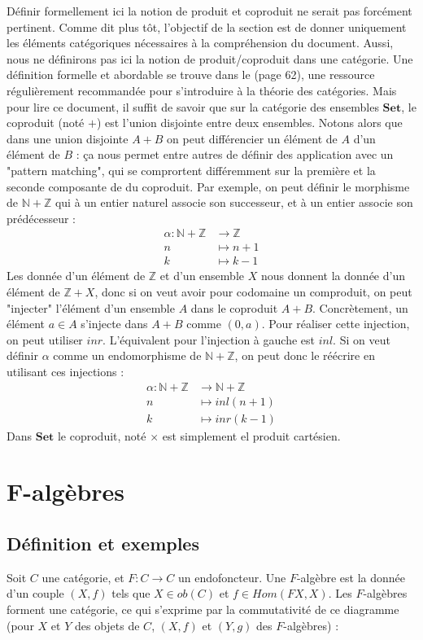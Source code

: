 \documentclass{article}
\newcommand{\N}{\mathbb{N}}
\newcommand{\Z}{\mathbb{Z}}
\begin{document}
Définir formellement ici la notion de produit et coproduit ne serait pas forcément pertinent. Comme dit plus tôt, l'objectif de la section est de donner uniquement les éléments catégoriques nécessaires à la compréhension du document. Aussi, nous ne définirons pas ici la notion de produit/coproduit dans une catégorie. Une définition formelle et abordable se trouve dans le \cite{MacLane} (page 62), une ressource régulièrement recommandée pour s'introduire à la théorie des catégories. Mais pour lire ce document, il suffit de savoir que sur la catégorie des ensembles $\mathbf{Set}$, le coproduit (noté $+$) est l'union disjointe entre deux ensembles. Notons alors que dans une union disjointe $A+B$ on peut différencier un élément de $A$ d'un élément de $B$ : ça nous permet entre autres de définir des application avec un "pattern matching", qui se comprortent différemment sur la première et la seconde composante de du coproduit. Par exemple, on peut définir le morphisme de $\N + \Z$ qui à un entier naturel associe son successeur, et à un entier associe son prédécesseur : 
\begin{align*}
     \alpha : \N + \Z & \rightarrow \Z \\ 
     n & \mapsto n+1 \\ 
     k & \mapsto k-1     
\end{align*}
Les donnée d'un élément de $\Z$ et d'un ensemble $X$ nous donnent la donnée d'un élément de $\Z + X$, donc si on veut avoir pour codomaine un comproduit, on peut "injecter" l'élément d'un ensemble $A$ dans le coproduit $A+B$. Concrètement,  un élément $a \in A$ s'injecte dans $A+B$ comme $(0,a)$. Pour réaliser cette injection, on peut utiliser $inr$. L'équivalent pour l'injection à gauche est $inl$. Si on veut définir $\alpha$ comme un endomorphisme de $\N + \Z$, on peut donc le réécrire en utilisant ces injections :
\begin{align*}
     \alpha : \N + \Z & \rightarrow \N + \Z \\ 
     n & \mapsto inl(n+1) \\ 
     k & \mapsto inr(k-1)     
\end{align*}
Dans $\mathbf{Set}$ le coproduit, noté $\times$ est simplement el produit cartésien. 


\section{F-algèbres}

\subsection{Définition et exemples}
Soit $C$ une catégorie, et $F :C \longrightarrow C$ un endofoncteur. Une $F$-algèbre est la donnée d'un couple $(X,f)$ tels que $X \in ob(C)$ et $f \in Hom(F X, X)$. Les $F$-algèbres forment une catégorie, ce qui s'exprime par la commutativité de ce diagramme (pour $X$ et $Y$ des objets de $C$, $(X,f)$ et $(Y,g)$ des $F$-algèbres) : 
\end{document}
